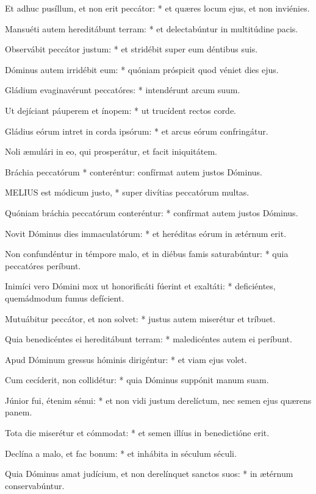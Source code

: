 Et adhuc pusíllum, et non erit peccátor: * et quæres locum ejus, et non inviénies.

Mansuéti autem hereditábunt terram: * et delectabúntur in multitúdine pacis.

Observábit peccátor justum: * et stridébit super eum déntibus suis.

Dóminus autem irridébit eum: * quóniam próspicit quod véniet dies ejus.

Gládium evaginavérunt peccatóres: * intendérunt arcum suum.

Ut dejíciant páuperem et ínopem: * ut trucídent rectos corde.

Gládius eórum intret in corda ipsórum: * et arcus eórum confringátur.

 Noli æmulári in eo, qui prosperátur, et facit iniquitátem.

 Bráchia peccatórum * conteréntur: confírmat autem justos Dóminus.


\lettrine[lines=2]{M}{ELIUS} est módicum justo, * super divítias peccatórum multas.

Quóniam bráchia peccatórum conteréntur: * confírmat autem justos Dóminus.

Novit Dóminus dies immaculatórum: * et heréditas eórum in ætérnum erit.

Non confundéntur in témpore malo, et in diébus famis saturabúntur: * quia peccatóres períbunt.

Inimíci vero Dómini mox ut honorificáti fúerint et exaltáti: * deficiéntes, quemádmodum fumus defícient.

Mutuábitur peccátor, et non solvet: * justus autem miserétur et tríbuet.

Quia benedicéntes ei hereditábunt terram: * maledicéntes autem ei períbunt.

Apud Dóminum gressus hóminis dirigéntur: * et viam ejus volet.

Cum cecíderit, non collidétur: * quia Dóminus suppónit manum suam.

Júnior fui, étenim sénui: * et non vidi justum derelíctum, nec semen ejus quærens panem.

Tota die miserétur et cómmodat: * et semen illíus in benedictióne erit.

Declína a malo, et fac bonum: * et inhábita in séculum séculi.

Quia Dóminus amat judícium, et non derelínquet sanctos suos: * in ætérnum conservabúntur.

